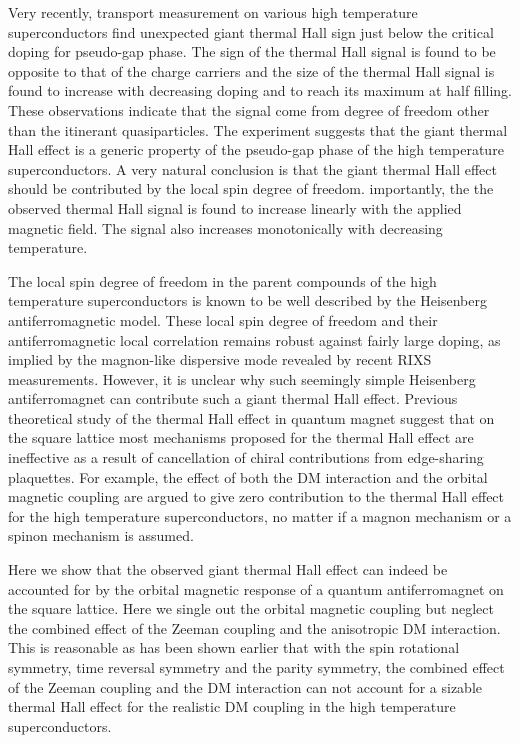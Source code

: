 \documentclass[prb,twocolumn,showpacs]{revtex4}
\begin{document}
Very recently, transport measurement on various high temperature superconductors find unexpected giant thermal Hall sign just below the critical doping for pseudo-gap phase\cite{Taillefer}. The sign of the thermal Hall signal is found to be opposite to that of the charge carriers and the size of the thermal Hall signal is found to increase with decreasing doping and to reach its maximum at half filling. These observations indicate that the signal come from degree of freedom other than the itinerant quasiparticles. The experiment suggests that the giant thermal Hall effect is a generic property of the pseudo-gap phase of the high temperature superconductors. A very natural conclusion is that the giant thermal Hall effect should be contributed by the local spin degree of freedom. importantly, the the observed thermal Hall signal is found to increase linearly with the applied magnetic field. The signal also increases monotonically with decreasing temperature.


The local spin degree of freedom in the parent compounds of the high temperature superconductors is known to be well described by the Heisenberg antiferromagnetic model. These local spin degree of freedom and their antiferromagnetic local correlation remains robust against fairly large doping, as implied by the magnon-like dispersive mode revealed by recent RIXS measurements\cite{RIXS}. However, it is unclear why such seemingly simple Heisenberg antiferromagnet can contribute such a giant thermal Hall effect. Previous theoretical study of the thermal Hall effect in quantum magnet suggest that on the square lattice most mechanisms proposed for the thermal Hall effect are ineffective as a result of cancellation of chiral contributions from edge-sharing plaquettes\cite{PALee2,Murakami,Hotta,PALee,Sachdev,Xu,ZXLi}. For example, the effect of both the DM interaction and the orbital magnetic coupling are argued to give zero contribution to the thermal Hall effect for the high temperature superconductors, no matter if a magnon mechanism or a spinon mechanism is assumed.

Here we show that the observed giant thermal Hall effect can indeed be accounted for by the orbital magnetic response of a quantum antiferromagnet on the square lattice. Here we single out the orbital magnetic coupling but neglect the combined effect of the Zeeman coupling and the anisotropic DM interaction. This is reasonable as has been shown earlier that with the spin rotational symmetry, time reversal symmetry and the parity symmetry, the combined effect of the  Zeeman coupling and the DM interaction can not account for a sizable thermal Hall effect for the realistic DM coupling in the high temperature superconductors.    
\end{document}
